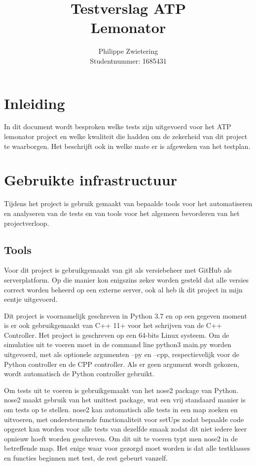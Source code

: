 \documentclass{article}
\title{Testverslag ATP\\
		   Lemonator}
\author{Philippe Zwietering\\
	           Studentnummer: 1685431}
\begin{document}
	\maketitle
      	
    \clearpage
    
    \section{Inleiding}
    
    In dit document wordt besproken welke tests zijn uitgevoerd voor het ATP lemonator project en welke kwaliteit die hadden om de zekerheid van dit project te waarborgen. Het beschrijft ook in welke mate er is afgeweken van het testplan.
    
    \section{Gebruikte infrastructuur} 
    Tijdens het project is gebruik gemaakt van bepaalde tools voor het automatiseren en analyseren van de tests en van tools voor het algemeen bevorderen van het projectverloop.
    
    \subsection{Tools}
    Voor dit project is gebruikgemaakt van git als versiebeheer met GitHub als serverplatform. Op die manier kon enigszins zeker worden gesteld dat alle versies correct worden beheerd op een externe server, ook al heb ik dit project in mijn eentje uitgevoerd. 
    
    Dit project is voornamelijk geschreven in Python 3.7 en op een gegeven moment is er ook gebruikgemaakt van C++ 11+ voor het schrijven van de C++ Controller. Het project is geschreven op een 64-bits Linux systeem. Om de simulaties uit te voeren moet in de command line python3 main.py worden uitgevoerd, met als optionele argumenten --py en --cpp, respectievelijk voor de Python controller en de CPP controller. Als er geen argument wordt gekozen, wordt automatisch de Python controller gebruikt.
    
    Om tests uit te voeren is gebruikgemaakt van het nose2 package van Python. nose2 maakt gebruik van het unittest package, wat een vrij standaard manier is om tests op te stellen. nose2 kan automatisch alle tests in een map zoeken en uitvoeren, met ondersteunende functionaliteit voor setUps zodat bepaalde code opgezet kan worden voor alle tests van dezelfde smaak zodat dit niet iedere keer opnieuw hoeft worden geschreven. Om dit uit te voeren typt men nose2 in de betreffende map. Het enige waar voor gezorgd moet worden is dat alle testklasses en functies beginnen met test, de rest gebeurt vanzelf.
    
\end{document}
